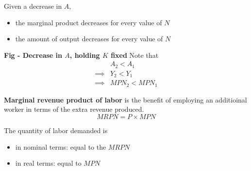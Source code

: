 \documentclass[letterpaper, 9pt,landscape]{extarticle}
\begin{document}
\begin{multicols*}{5}
\begin{remark}
Given a decrease in $A$, 
    \begin{itemize}
        \item the marginal product decreases for every value of $N$
        \item the amount of output decreases for every value of $N$
    \end{itemize} 
    \centering
    \textbf{Fig - Decrease in $A$, holding $K$ fixed}
    Note that 
    \begin{align*}
        &A_2 < A_1 \\
        \implies&  Y_2 < Y_1 \\
        \implies&  MPN_2 <  MPN_1
    \end{align*}
\end{remark}

\begin{definition}
    \textbf{Marginal revenue product of labor} is the benefit of employing an additioinal worker in terms of the extra revenue produced. 
    \[
        MRPN = P \times MPN
    \]
\end{definition}

The quantity of labor demanded is 
\begin{itemize}
    \item in nominal terms: equal to the $MRPN$
    \item in real terms: equal to $MPN$
\end{itemize} 


\end{multicols*}
\end{document}
